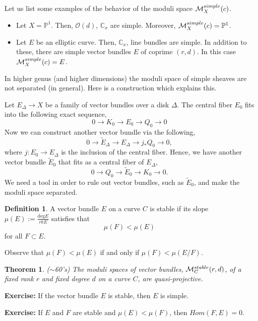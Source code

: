 \documentclass[reqno]{amsart}
\theoremstyle{plain}
\newtheorem{theo}[theorem]{Theorem}
\theoremstyle{definition}
\newtheorem{definition}[theorem]{Definition}
\theoremstyle{remark}
\begin{document}
Let us list some examples of the behavior of the moduli space $\mathcal{M}_X^{\tiny{simple}}(c)$.
\begin{itemize}
\item Let $X=\mathbb{P}^1$. Then, $\mathcal{O}(d)$, $\mathbb{C}_x$ are simple. Moreover, $\mathcal{M}_X^{\tiny{simple}}(c)=\mathbb{P}^1$.

\item Let $E$ be an elliptic curve. Then, $\mathbb{C}_x$, line bundles are simple. In addition to these, there are simple vector bundles $E$ of coprime $(r,d)$. In this case $\mathcal{M}_X^{\tiny{simple}}(c)=E$.
\end{itemize}

In higher genus (and higher dimensions) the moduli space of simple sheaves are not separated (in general). Here is a construction which explains this.

Let $E_{\Delta}\rightarrow X$ be a family of vector bundles over a disk $\Delta$. The central fiber $E_0$ fits into the following exact sequence,
$$0\longrightarrow K_0\longrightarrow E_0\longrightarrow Q_0\longrightarrow 0 $$
Now we can construct another vector bundle via the following,
$$0\longrightarrow \tilde E_{\Delta} \longrightarrow E_{\Delta}\longrightarrow j_*Q_0\longrightarrow 0, $$ where $j:E_0\rightarrow E_{\Delta}$ is the inclusion of the central fiber.
Hence, we have another vector bundle $\tilde E_0$ that fits as a central fiber of $E_{\Delta}$,
$$0\longrightarrow Q_0\longrightarrow \tilde E_0\longrightarrow K_0\longrightarrow 0. $$
We need a tool in order to rule out vector bundles, such as $\tilde E_0$, and make the moduli space separated. 

\begin{definition}
A vector bundle $E$ on a curve $C$ is stable if its slope $\mu(E):=\frac{\mathrm{deg}E}{rk E}$ satisfies that $$\mu(F)<\mu(E) $$ for all $F\subset E$.
\end{definition}

Observe that $\mu(F)<\mu(E) $ if and only if $\mu(F)<\mu(E/F) $.

\begin{theo}($\sim$60's)
The moduli spaces of vector bundles, $\mathcal{M}_C^{\tiny{stable}}(r,d)$, of a fixed rank $r$ and fixed degree $d$ on a curve $C$, are quasi-projective.
\end{theo}

\textbf{Exercise:} If the vector bundle $E$ is stable, then $E$ is simple.

\medskip
\textbf{Exercise:} If $E$ and $F$ are stable and $\mu(E)<\mu(F)$, then $Hom(F,E)=0$.
\end{document}

